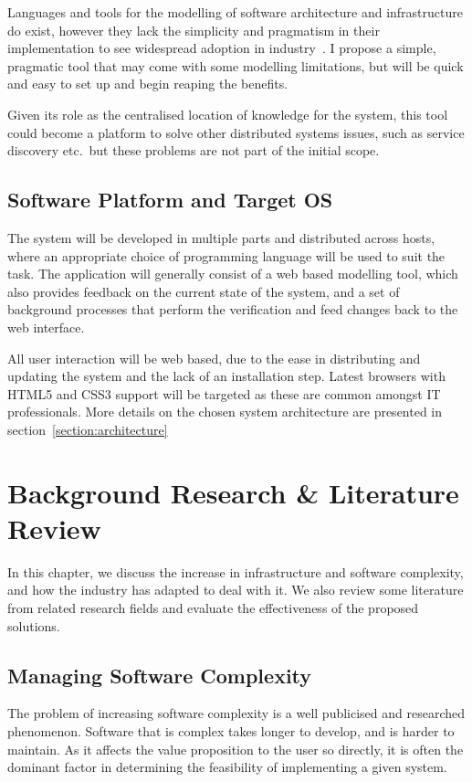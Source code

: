 \documentclass{cshonours}
\begin{document}
Languages and tools for the modelling of software architecture and infrastructure do exist, however they lack the simplicity and pragmatism in their implementation to see widespread adoption in industry~\cite{ModellingAdoption}. I propose a simple, pragmatic tool that may come with some modelling limitations, but will be quick and easy to set up and begin reaping the benefits.

Given its role as the centralised location of knowledge for the system, this tool could become a platform to solve other distributed systems issues, such as service discovery etc.\ but these problems are not part of the initial scope.

\section{Software Platform and Target OS}

The system will be developed in multiple parts and distributed across hosts, where an appropriate choice of programming language will be used to suit the task. The application will generally consist of a web based modelling tool, which also provides feedback on the current state of the system, and a set of background processes that perform the verification and feed changes back to the web interface.

All user interaction will be web based, due to the ease in distributing and updating the system and the lack of an installation step. Latest browsers with HTML5 and CSS3 support will be targeted as these are common amongst IT professionals. More details on the chosen system architecture are presented in section~\ref{section:architecture}

\chapter{Background Research \& Literature Review}

In this chapter, we discuss the increase in infrastructure and software complexity, and how the industry has adapted to deal with it. We also review some literature from related research fields and evaluate the effectiveness of the proposed solutions.

\section{Managing Software Complexity}

The problem of increasing software complexity is a well publicised and researched phenomenon. Software that is complex takes longer to develop, and is harder to maintain. As it affects the value proposition to the user so directly, it is often the dominant factor in determining the feasibility of implementing a given system.
\end{document}
